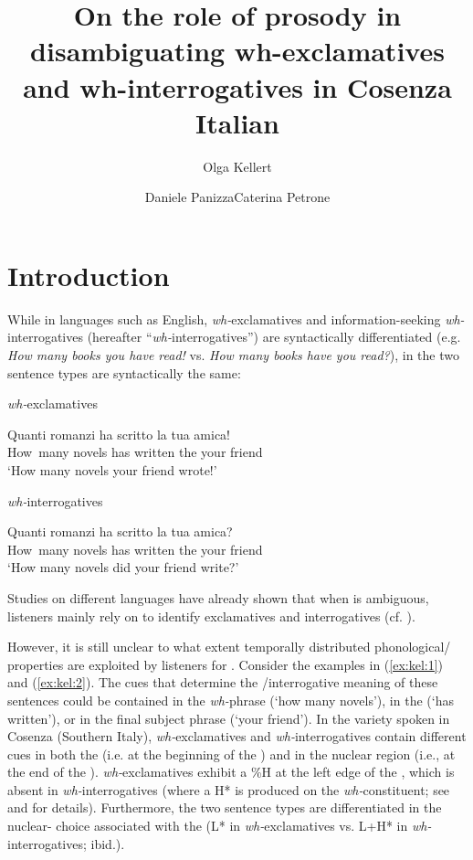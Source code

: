 \documentclass[output=paper]{langsci/langscibook}
\author{Olga Kellert\affiliation{Georg-August-Universität Göttingen}\and Daniele Panizza\affiliation{Georg-August-Universität Göttingen}\lastand Caterina Petrone\affiliation{Laboratoire Parole et Langage, Aix-Marseille Université}}
\title{On the role of prosody in disambiguating wh-exclamatives and wh-interrogatives in Cosenza Italian}
\begin{document}
\label{chap:kel}\label{ch:5}
 

  
 

\section{Introduction}

While in languages such as English, \textit{wh-}exclamatives and information-seeking \textit{wh-}interrogatives (hereafter “\textit{wh-}interrogatives”) are syntactically differentiated (e.g. \textit{How many books you have read!} vs. \textit{How many books have you read?}), in  the two sentence types are syntactically the same: 



\ea\label{ex:kel:1}
 \textit{wh-}exclamatives

\gll Quanti    romanzi  ha  scritto   la  tua  amica! \\
     How~many  novels   has written   the your friend\\
\glt `How many novels your friend wrote!'
\z


\ea\label{ex:kel:2}
  \textit{wh-}interrogatives

\gll Quanti     romanzi  ha  scritto   la   tua amica?    \\
     How~many   novels   has written   the your friend\\
\glt `How many novels did your friend write?'
\z


Studies on different languages have already shown that when  is ambiguous, listeners mainly rely on  to identify exclamatives and interrogatives (cf. \citealt{Batliner1988,Eady1986,Sorianello2011exclamative,Sorianello2012,Gyuris2013}). 

However, it is still unclear to what extent temporally distributed phonological/ properties are exploited by listeners for . Consider the  examples in (\ref{ex:kel:1}) and (\ref{ex:kel:2}). The  cues that determine the /interrogative meaning of these sentences could be contained in the \textit{wh-}phrase (`how many novels’), in the  (`has written’), or in the final subject phrase (`your friend’). In the variety spoken in Cosenza (Southern Italy), \textit{wh-}exclamatives and \textit{wh-}interrogatives contain different  cues in both the  (i.e. at the beginning of the ) and in the nuclear region (i.e., at the end of the ). \textit{wh-}exclamatives exhibit a \%H at the left edge of the , which is absent in \textit{wh-}interrogatives (where a  H* is produced on the \textit{wh-}constituent; see \citealt{Sorianello2012} and  for details). Furthermore, the two sentence types are differentiated in the nuclear- choice associated with the  (L* in \textit{wh-}exclamatives vs. L+H* in \textit{wh-}interrogatives; ibid.).
\end{document}

